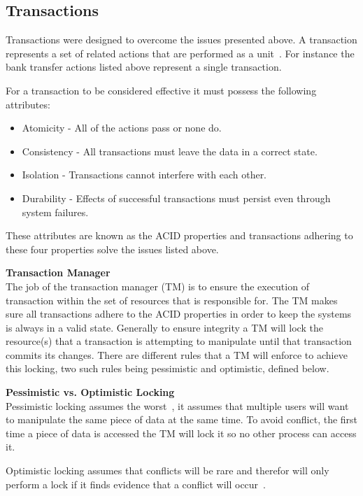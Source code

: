 \documentclass[a4paper,12pt]{article}
\begin{document}
\subsection*{Transactions}
Transactions were designed to overcome the issues presented above.
A transaction represents a set of related actions that are performed as a unit~\citep{nested-transactions}.
For instance the bank transfer actions listed above represent a single transaction. 

For a transaction to be considered effective it must possess the following attributes:
\begin{itemize} 
    \item{Atomicity - All of the actions pass or none do.}
    \item{Consistency - All transactions must leave the data in a correct state.}
    \item{Isolation - Transactions cannot interfere with each other.}
    \item{Durability - Effects of successful transactions must persist even through system failures.}
\end{itemize}
These attributes are known as the ACID properties and transactions adhering to these four properties solve the issues listed above.

\par\textbf{Transaction Manager}\\
The job of the transaction manager (TM) is to ensure the execution of transaction within the set of resources that is responsible for.
The TM makes sure all transactions adhere to the ACID properties in order to keep the systems is always in a valid state.
Generally to ensure integrity a TM will lock the resource(s) that a transaction is attempting to manipulate until that transaction commits its changes.
There are different rules that a TM will enforce to achieve this locking, two such rules being pessimistic and optimistic, defined below.

\par\textbf{Pessimistic vs. Optimistic Locking}\\
Pessimistic locking assumes the worst~\citep{pessimistic-vs-optimistic}, it assumes that multiple users will want to manipulate the same piece of data at the same time. To avoid conflict, the first time a piece of data is accessed the TM will lock it so no other process can access it.

Optimistic locking assumes that conflicts will be rare and therefor will only perform a lock if it finds evidence that a conflict will occur~\citep{pessimistic-vs-optimistic}.
\end{document}

